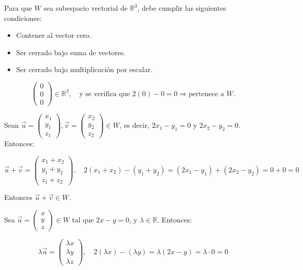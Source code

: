 \documentclass[a4paper]{article}
\begin{document}
\begin{enumerate}
Para que \(W\) sea subespacio vectorial de \(\mathbb{R}^3\), debe cumplir las siguientes condiciones:

\begin{itemize}
  \item Contener al vector cero.
  \item Ser cerrado bajo suma de vectores.
  \item Ser cerrado bajo multiplicación por escalar.
\end{itemize}



\[
\begin{pmatrix} 0 \\ 0 \\ 0 \end{pmatrix} \in \mathbb{R}^3,\quad \text{y se verifica que } 2(0) - 0 = 0 \Rightarrow \text{pertenece a } W.
\]


Sean \(\vec{u} = \begin{pmatrix} x_1 \\ y_1 \\ z_1 \end{pmatrix}, \vec{v} = \begin{pmatrix} x_2 \\ y_2 \\ z_2 \end{pmatrix} \in W\), es decir, \(2x_1 - y_1 = 0\) y \(2x_2 - y_2 = 0\). Entonces:

\[
\vec{u} + \vec{v} = \begin{pmatrix} x_1 + x_2 \\ y_1 + y_2 \\ z_1 + z_2 \end{pmatrix},\quad
2(x_1 + x_2) - (y_1 + y_2) = (2x_1 - y_1) + (2x_2 - y_2) = 0 + 0 = 0
\]

Entonces \(\vec{u} + \vec{v} \in W\).



Sea \(\vec{u} = \begin{pmatrix} x \\ y \\ z \end{pmatrix} \in W\) tal que \(2x - y = 0\), y \(\lambda \in \mathbb{R}\). Entonces:

\[
\lambda \vec{u} = \begin{pmatrix} \lambda x \\ \lambda y \\ \lambda z \end{pmatrix},\quad
2(\lambda x) - (\lambda y) = \lambda (2x - y) = \lambda \cdot 0 = 0
\]


\end{enumerate}
\end{document}
